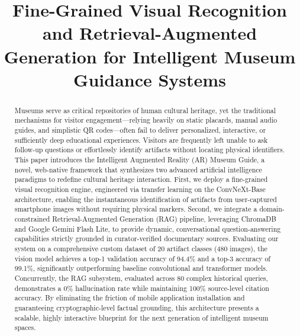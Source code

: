 \documentclass[conference]{IEEEtran}
\begin{document}
\title{Fine-Grained Visual Recognition and Retrieval-Augmented Generation for Intelligent Museum Guidance Systems\\
}

\author{
}

\maketitle

\begin{abstract}
Museums serve as critical repositories of human cultural heritage, yet the traditional mechanisms for visitor engagement—relying heavily on static placards, manual audio guides, and simplistic QR codes—often fail to deliver personalized, interactive, or sufficiently deep educational experiences. Visitors are frequently left unable to ask follow-up questions or effortlessly identify artifacts without locating physical identifiers. This paper introduces the Intelligent Augmented Reality (AR) Museum Guide, a novel, web-native framework that synthesizes two advanced artificial intelligence paradigms to redefine cultural heritage interaction. First, we deploy a fine-grained visual recognition engine, engineered via transfer learning on the ConvNeXt-Base architecture, enabling the instantaneous identification of artifacts from user-captured smartphone images without requiring physical markers. Second, we integrate a domain-constrained Retrieval-Augmented Generation (RAG) pipeline, leveraging ChromaDB and Google Gemini Flash Lite, to provide dynamic, conversational question-answering capabilities strictly grounded in curator-verified documentary sources. Evaluating our system on a comprehensive custom dataset of 20 artifact classes (480 images), the vision model achieves a top-1 validation accuracy of 94.4\% and a top-3 accuracy of 99.1\%, significantly outperforming baseline convolutional and transformer models. Concurrently, the RAG subsystem, evaluated across 80 complex historical queries, demonstrates a 0\% hallucination rate while maintaining 100\% source-level citation accuracy. By eliminating the friction of mobile application installation and guaranteeing cryptographic-level factual grounding, this architecture presents a scalable, highly interactive blueprint for the next generation of intelligent museum spaces.
\end{abstract}
\end{document}
